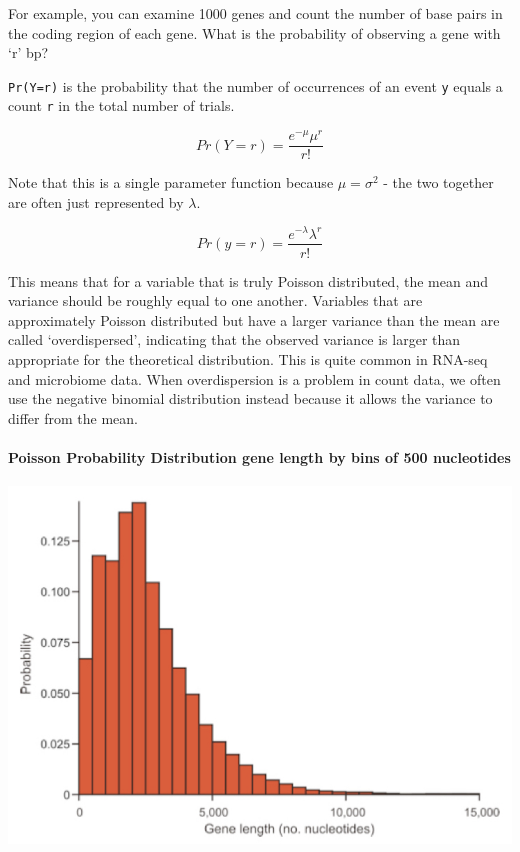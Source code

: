 \documentclass[]{book}
\let\oldparagraph\paragraph
\renewcommand{\paragraph}[1]{\oldparagraph{#1}\mbox{}}
\begin{document}
For example, you can examine 1000 genes and count the number of base pairs in the coding region of each gene. What is the probability of observing a gene with `r' bp?

\texttt{Pr(Y=r)} is the probability that the number of occurrences of an event \texttt{y} equals a count \texttt{r} in the total number of trials.

\[Pr(Y=r) = \frac{e^{-\mu}\mu^r}{r!}\]

Note that this is a single parameter function because \(\mu = \sigma^2\) - the two together are often just represented by \(\lambda\).

\[Pr(y=r) = \frac{e^{-\lambda}\lambda^r}{r!}\]

This means that for a variable that is truly Poisson distributed, the mean and variance should be roughly equal to one another. Variables that are approximately Poisson distributed but have a larger variance than the mean are called `overdispersed', indicating that the observed variance is larger than appropriate for the theoretical distribution. This is quite common in RNA-seq and microbiome data. When overdispersion is a problem in count data, we often use the negative binomial distribution instead because it allows the variance to differ from the mean.

\hypertarget{poisson-probability-distribution-gene-length-by-bins-of-500-nucleotides}{%
\paragraph{Poisson Probability Distribution \textbar{} gene length by bins of 500 nucleotides}\label{poisson-probability-distribution-gene-length-by-bins-of-500-nucleotides}}

\begin{center}\includegraphics[width=0.8\linewidth]{images/week_2.004} \end{center}
\end{document}
